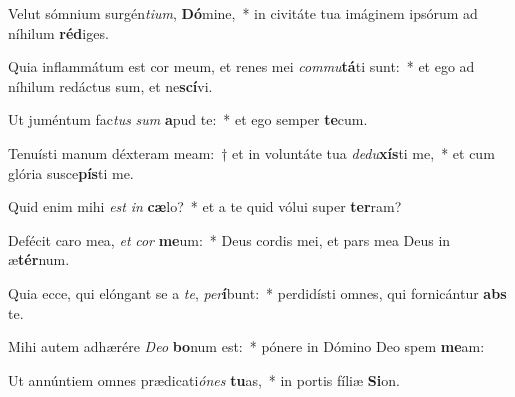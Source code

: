 \item Velut sómnium surgén\textit{ti}\textit{um}, \textbf{Dó}mine,~* in civitáte tua imáginem ipsórum ad níhilum \textbf{réd}iges.
\item Quia inflammátum est cor meum, et renes mei \textit{com}\textit{mu}\textbf{tá}ti sunt:~* et ego ad níhilum redáctus sum, et ne\textbf{scí}vi.
\item Ut juméntum fac\textit{tus} \textit{sum} \textbf{a}pud te:~* et ego semper \textbf{te}cum.
\item Tenuísti manum déxteram meam:~† et in voluntáte tua \textit{de}\textit{du}\textbf{xís}ti me,~* et cum glória susce\textbf{pís}ti me.
\item Quid enim mihi \textit{est} \textit{in} \textbf{cæ}lo?~* et a te quid vólui super \textbf{ter}ram?
\item Defécit caro mea, \textit{et} \textit{cor} \textbf{me}um:~* Deus cordis mei, et pars mea Deus in æ\textbf{tér}num.
\item Quia ecce, qui elóngant se a \textit{te}, \textit{per}\textbf{í}bunt:~* perdidísti omnes, qui fornicántur \textbf{abs} te.
\item Mihi autem adhærére \textit{De}\textit{o} \textbf{bo}num est:~* pónere in Dómino Deo spem \textbf{me}am:
\item Ut annúntiem omnes prædicati\textit{ó}\textit{nes} \textbf{tu}as,~* in portis fíliæ \textbf{Si}on.
